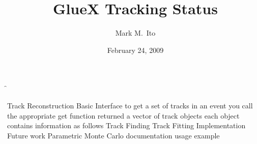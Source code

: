 \documentclass[xcolor=dvipsnames]{beamer}
\title{GlueX Tracking Status}
\author[M.\ Ito]{Mark M.\ Ito}
\date{February 24, 2009}
\institute[JLab]{Jefferson Lab}
\begin{document}
\f{

\be
\I Track Reconstruction
  \be
  \I Basic Interface
    \be
    \I to get a set of tracks in an event you call the appropriate get function
    \I returned a vector of track objects
    \I each object contains information as follows
    \ee
  \I Track Finding
  \I Track Fitting
  \I Implementation
  \I Future work
  \ee
\I Parametric Monte Carlo
  \be
  \I documentation
  \I usage example
  \ee
\ee

}
\end{document}
